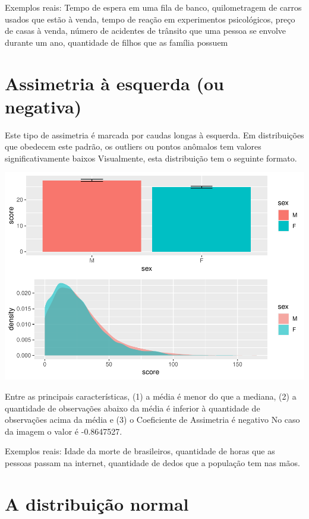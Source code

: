 \documentclass[
]{book}
\begin{document}
Exemplos reais: Tempo de espera em uma fila de banco, quilometragem de carros usados que estão à venda, tempo de reação em experimentos psicológicos, preço de casas à venda, número de acidentes de trânsito que uma pessoa se envolve durante um ano, quantidade de filhos que as família possuem

\hypertarget{assimetria-uxe0-esquerda-ou-negativa}{%
\section{Assimetria à esquerda (ou negativa)}\label{assimetria-uxe0-esquerda-ou-negativa}}

Este tipo de assimetria é marcada por caudas longas à esquerda. Em distribuições que obedecem este padrão, os outliers ou pontos anômalos tem valores significativamente baixos Visualmente, esta distribuição tem o seguinte formato.

\begin{center}\includegraphics{gitbook-demo_files/figure-latex/unnamed-chunk-38-1} \end{center}

Entre as principais características, (1) a média é menor do que a mediana, (2) a quantidade de observações abaixo da média é inferior à quantidade de observações acima da média e (3) o Coeficiente de Assimetria é negativo No caso da imagem o valor é -0.8647527.

Exemplos reais: Idade da morte de brasileiros, quantidade de horas que as pessoas passam na internet, quantidade de dedos que a população tem nas mãos.

\hypertarget{a-distribuiuxe7uxe3o-normal}{%
\section{A distribuição normal}\label{a-distribuiuxe7uxe3o-normal}}
\end{document}
